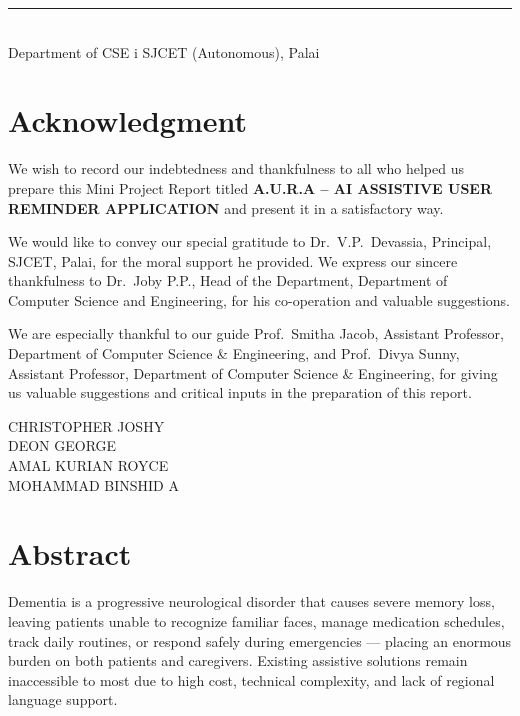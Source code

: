 \documentclass[12pt,a4paper]{report}
\begin{document}
\vfill
\noindent\rule{\textwidth}{0.4pt}\\[2pt]
{\small Department of CSE \hfill i \hfill SJCET (Autonomous), Palai}

\newpage
\chapter*{Acknowledgment}
\setcounter{page}{2}

We wish to record our indebtedness and thankfulness to all who helped us prepare this Mini Project Report titled \textbf{A.U.R.A -- AI ASSISTIVE USER REMINDER APPLICATION} and present it in a satisfactory way.

We would like to convey our special gratitude to Dr.\ V.P.\ Devassia, Principal, SJCET, Palai, for the moral support he provided. We express our sincere thankfulness to Dr.\ Joby P.P., Head of the Department, Department of Computer Science and Engineering, for his co-operation and valuable suggestions.

We are especially thankful to our guide Prof.\ Smitha Jacob, Assistant Professor, Department of Computer Science \&  Engineering, and Prof.\ Divya Sunny, Assistant Professor, Department of Computer Science \&  Engineering,  for giving us valuable suggestions and critical inputs in the preparation of this report.

\vspace{1.5cm}
\begin{flushright}
CHRISTOPHER JOSHY\\
DEON GEORGE\\
AMAL KURIAN ROYCE\\
MOHAMMAD BINSHID A
\end{flushright}

\newpage
\chapter*{Abstract}
\setcounter{page}{3}

Dementia is a progressive neurological disorder that causes severe memory 
loss, leaving patients unable to recognize familiar faces, manage medication 
schedules, track daily routines, or respond safely during emergencies --- 
placing an enormous burden on both patients and caregivers. Existing 
assistive solutions remain inaccessible to most due to high cost, technical 
complexity, and lack of regional language support.
\end{document}
